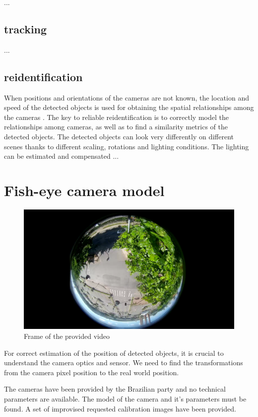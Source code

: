 \documentclass[a4paper,12pt,titlepage, twoside]{article}
\numberwithin{figure}{section}
\begin{document}
 

...
\subsection{tracking}
...
\subsection{reidentification}
When positions and orientations of the cameras are not known, the location and speed of the detected objects is used for obtaining the spatial relationships among the cameras \cite{makris2004bridging, rahimi2004simultaneous}. The key to reliable reidentification is to correctly model the relationships among cameras, as well as to find a similarity metrics of the detected objects. The detected objects can look very differently on different scenes thanks to different scaling, rotations and lighting conditions. The lighting can be estimated and compensated \cite{javed2005appearance}...



\section{Fish-eye camera model}
\label{sec:lens}

\begin{figure}[h]
\centering
\includegraphics[width=1\linewidth]{fig/stream1.png}
\caption{Frame of the provided video}
\label{fig:stream1}
\end{figure}

For correct estimation of the position of detected objects, it is crucial to understand the camera optics and sensor. We need to find the transformations from the camera pixel position to the real world position. 

The cameras have been provided by the Brazilian party and no technical parameters are available. The model of the camera and it's parameters must be found. A set of improvised requested calibration images have been provided.
\end{document}
